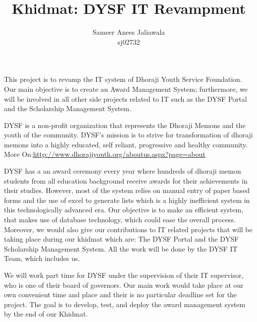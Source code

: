 \documentclass{article}
\title {Khidmat: DYSF IT Revampment}
\author{
  Sameer Anees Jaliawala\\ sj02732 
}
\date{}
\begin{document}
\maketitle


This project is to revamp the IT system of Dhoraji Youth Service Foundation. Our main objective is to create an Award Management System; furthermore, we will be involved in all other side projects related to IT such as the DYSF Portal and the Scholarship Management System.  

DYSF is a non-profit organization that represents the Dhoraji Memons and the youth of the community. DYSF's mission is to strive for transformation of dhoraji memons into a highly educated, self reliant, progressive and healthy community. More On:\newline \href{http://www.dhorajiyouth.org/aboutus.aspx?page=about}{http://www.dhorajiyouth.org/aboutus.aspx?page=about}

DYSF has a an award ceremony every year where hundreds of dhoraji memon students from all education background receive awards for their achievements in their studies. However, most of the system relies on manual entry of paper based forms and the use of excel to generate lists which is a highly inefficient system in this technologically advanced era. Our objective is to make an efficient system, that makes use of database technology, which could ease the overall process. Moreover, we would also give our contributions to IT related projects that will be taking place during our khidmat which are: The DYSF Portal and the DYSF Scholarship Management System. All the work will be done by the DYSF IT Team, which includes us.

We will work part time for DYSF under the supervision of their IT supervisor, who is one of their board of governors. Our main work would take place at our own convenient time and place and their is no particular deadline set for the project. The goal is to develop, test, and deploy the award management system by the end of our Khidmat.

\newpage %
\end{document}
